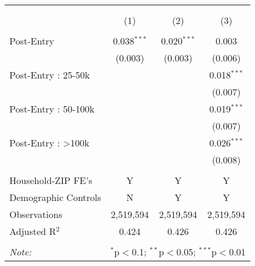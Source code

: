 
\begin{table}[!htbp] \centering 
  \caption{} 
  \label{} 
\begin{tabular}{@{\extracolsep{5pt}}lccc} 
\\[-1.8ex]\hline 
\hline \\[-1.8ex] 
\\[-1.8ex] & (1) & (2) & (3)\\ 
\hline \\[-1.8ex] 
 Post-Entry & 0.038$^{***}$ & 0.020$^{***}$ & 0.003 \\ 
  & (0.003) & (0.003) & (0.006) \\ 
  Post-Entry : 25-50k &  &  & 0.018$^{***}$ \\ 
  &  &  & (0.007) \\ 
  Post-Entry : 50-100k &  &  & 0.019$^{***}$ \\ 
  &  &  & (0.007) \\ 
  Post-Entry : >100k &  &  & 0.026$^{***}$ \\ 
  &  &  & (0.008) \\ 
 \hline \\[-1.8ex] 
Household-ZIP FE's & Y & Y & Y \\ 
Demographic Controls & N & Y & Y \\ 
Observations & 2,519,594 & 2,519,594 & 2,519,594 \\ 
Adjusted R$^{2}$ & 0.424 & 0.426 & 0.426 \\ 
\hline 
\hline \\[-1.8ex] 
\textit{Note:}  & \multicolumn{3}{l}{$^{*}$p$<$0.1; $^{**}$p$<$0.05; $^{***}$p$<$0.01} \\ 
\end{tabular} 
\end{table} 
